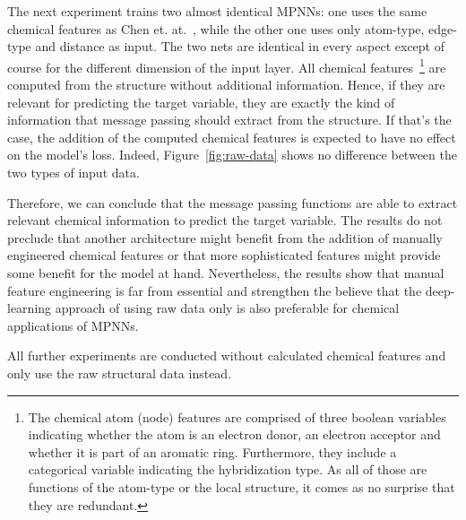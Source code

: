 The next experiment trains two almost identical MPNNs: one uses the same chemical features as Chen et. at.~\cite{Chen2019}, while the other one uses only atom-type, edge-type and distance as input. The two nets are identical in every aspect except of course for the different dimension of the input layer. All chemical features~\footnote{
	The chemical atom (node) features are comprised of three boolean variables indicating whether the atom is an electron donor, an electron acceptor and whether it is part of an aromatic ring. Furthermore, they include a categorical variable indicating the hybridization type. As all of those are functions of the atom-type or the local structure, it comes as no surprise that they are redundant.
	
}
are computed from the structure without additional information. Hence, if they are relevant for predicting the target variable, they are exactly the kind of information that message passing should extract from the structure. If that's the case, the addition of the computed chemical features is expected to have no effect on the model's loss. Indeed, Figure~\ref{fig:raw-data} shows no difference between the two types of input data.

Therefore, we can conclude that the message passing functions are able to extract relevant chemical information to predict the target variable. The results do not preclude that another architecture might benefit from the addition of manually engineered chemical features or that more sophisticated features might provide some benefit for the model at hand. Nevertheless, the results show that manual feature engineering is far from essential and strengthen the believe that the deep-learning approach of using raw data only is also preferable for chemical applications of MPNNs.

All further experiments are conducted without calculated chemical features and only use the raw structural data instead.


